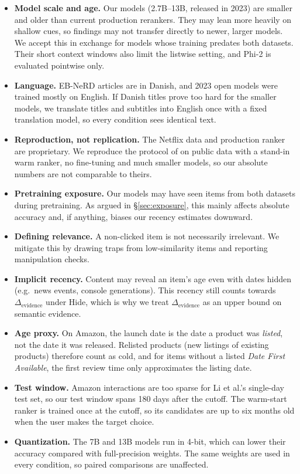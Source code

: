 \documentclass[11pt]{article}
\begin{document}
\begin{itemize}
  \item \textbf{Model scale and age.} Our models (2.7B--13B, released in 2023) are smaller and older than current production rerankers. They may lean more heavily on shallow cues, so findings may not transfer directly to newer, larger models. We accept this in exchange for models whose training predates both datasets. Their short context windows also limit the listwise setting, and Phi-2 is evaluated pointwise only.
  \item \textbf{Language.} EB-NeRD articles are in Danish, and 2023 open models were trained mostly on English. If Danish titles prove too hard for the smaller models, we translate titles and subtitles into English once with a fixed translation model, so every condition sees identical text.
  \item \textbf{Reproduction, not replication.} The Netflix data and production ranker are proprietary. We reproduce the protocol of \citet{li2026llmreasoning} on public data with a stand-in warm ranker, no fine-tuning and much smaller models, so our absolute numbers are not comparable to theirs.
  \item \textbf{Pretraining exposure.} Our models may have seen items from both datasets during pretraining. As argued in \S\ref{sec:exposure}, this mainly affects absolute accuracy and, if anything, biases our recency estimates downward.
  \item \textbf{Defining relevance.} A non-clicked item is not necessarily irrelevant. We mitigate this by drawing traps from low-similarity items and reporting manipulation checks.
  \item \textbf{Implicit recency.} Content may reveal an item's age even with dates hidden (e.g.\ news events, console generations). This recency still counts towards $\Delta_{\text{evidence}}$ under Hide, which is why we treat $\Delta_{\text{evidence}}$ as an upper bound on semantic evidence.
  \item \textbf{Age proxy.} On Amazon, the launch date is the date a product was \emph{listed}, not the date it was released. Relisted products (new listings of existing products) therefore count as cold, and for items without a listed \emph{Date First Available}, the first review time only approximates the listing date.
  \item \textbf{Test window.} Amazon interactions are too sparse for Li et al.'s single-day test set, so our test window spans 180 days after the cutoff. The warm-start ranker is trained once at the cutoff, so its candidates are up to six months old when the user makes the target choice.
  \item \textbf{Quantization.} The 7B and 13B models run in 4-bit, which can lower their accuracy compared with full-precision weights. The same weights are used in every condition, so paired comparisons are unaffected.
\end{itemize}


\end{document}
